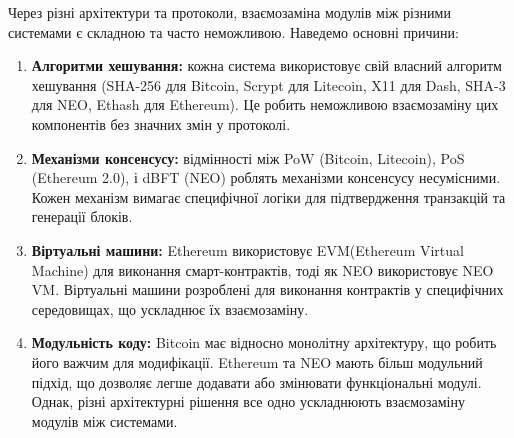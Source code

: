 \begin{itemize}
    Через різні архітектури та протоколи, взаємозаміна модулів між різними системами є складною та часто неможливою. Наведемо основні причини:
    \vspace{0.25cm}
    \begin{enumerate}
        \item \textbf{Алгоритми хешування:} кожна система використовує свій власний алгоритм хешування (SHA-256 для Bitcoin, Scrypt для Litecoin, X11 для Dash, SHA-3 для NEO, Ethash для Ethereum). Це робить неможливою взаємозаміну цих компонентів без значних змін у протоколі.
        \item \textbf{Механізми консенсусу:} відмінності між PoW (Bitcoin, Litecoin), PoS (Ethereum 2.0), і dBFT (NEO) роблять механізми консенсусу несумісними. Кожен механізм вимагає специфічної логіки для підтвердження транзакцій та генерації блоків.
        \item \textbf{Віртуальні машини:} Ethereum використовує EVM(Ethereum Virtual Machine) для виконання смарт-контрактів, тоді як NEO використовує NEO VM. Віртуальні машини розроблені для виконання контрактів у специфічних середовищах, що ускладнює їх взаємозаміну.
        \item \textbf{Модульність коду:} Bitcoin має відносно монолітну архітектуру, що робить його важчим для модифікації. Ethereum та NEO мають більш модульний підхід, що дозволяє легше додавати або змінювати функціональні модулі. Однак, різні архітектурні рішення все одно ускладнюють взаємозаміну модулів між системами.
    \end{enumerate}
\end{itemize}

\newpage

